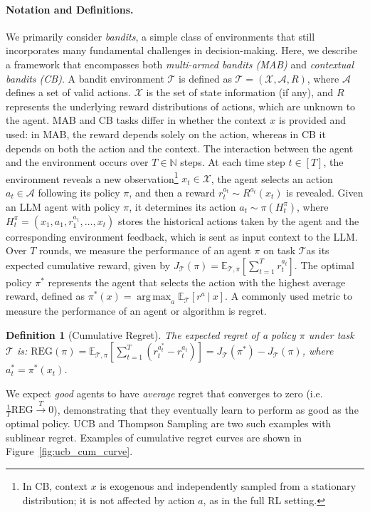 \documentclass[11pt, logo]{googledeepmind}
\newtheorem{defn}{Definition}[]
\def\gA{{\mathcal{A}}}
\def\gT{{\mathcal{T}}}
\def\gX{{\mathcal{X}}}
\newcommand{\E}{\mathbb{E}}
\DeclareMathOperator*{\argmax}{arg\,max}
\theoremstyle{plain}
\theoremstyle{definition}
\begin{document}
\paragraph{Notation and Definitions.}
\label{sec:notations}
We primarily consider \textit{bandits}, a simple class of environments that still incorporates many fundamental challenges in decision-making. Here, we describe a framework that encompasses both \textit{multi-armed bandits (MAB)} and \textit{contextual bandits (CB)}. A bandit environment $\gT$ is defined as $\gT=(\gX, \gA, R)$, where $\gA$ defines a set of valid actions. $\gX$ is the set of state information (if any), and $R$ represents the underlying reward distributions of actions, which are unknown to the agent.
MAB and CB tasks differ in whether the context $x$ is provided and used: in MAB, the reward depends solely on the action, whereas in CB it depends on both the action and the context.
The interaction between the agent and the environment occurs over $T \in \mathbb{N}$ steps. At each time step $t \in [T]$, the environment reveals a new observation\footnote{In CB, context $x$ is exogenous and independently sampled from a stationary distribution; it is not affected by action $a$, as in the full RL setting.} $x_t \in \gX$, the agent selects an action $a_t \in \mathcal{A}$ following its policy $\pi$, and then a reward $r_t^{a_t} \sim R^{a_t}(x_t)$ is revealed.
Given an LLM agent with policy $\pi$, it determines its action $a_t \sim \pi(H^\pi_t)$, where $H^\pi_t = (x_1, a_1, r_1^{a_1}, \ldots, x_t)$ stores the historical actions taken by the agent and the corresponding environment feedback, which is sent as input context to the LLM.
Over $T$ rounds, we measure the performance of an agent $\pi$ on task $\mathcal{T} $as its expected cumulative reward, given by $J_{\mathcal{T}}(\pi) = \E_{\mathcal{T}, \pi} \left[\sum_{t =1}^T r_t^{a_t}\right]$. The optimal policy $\pi^*$ represents the agent that selects the action with the highest average reward, defined as $\pi^*(x) = \argmax_a \E_{\mathcal T}\left[r^a \ | \ x \right]$.
A commonly used metric to measure the performance of an agent or algorithm is regret.
\begin{defn}[Cumulative Regret]
The expected regret of a policy $\pi$ under task $\mathcal{T}$ is: $\text{REG}(\pi) = \E_{\mathcal{T}, \pi} \left[\sum_{t=1}^T (r_t^{a^*_t} - r_t^{a_t})  \right] = J_{\mathcal{T}}(\pi^*) - J_\mathcal{T}(\pi)$, where $a^*_t = \pi^*(x_t)$.
\end{defn}
We expect \emph{good} agents to have \textit{average} regret that converges to zero (i.e. $\frac{1}{T}\text{REG} \stackrel{T}{\rightarrow} 0$), demonstrating that they eventually learn to perform as good as the optimal policy. UCB and Thompson Sampling are two such examples with sublinear regret. Examples of cumulative regret curves are shown in Figure~\ref{fig:ucb_cum_curve}.
\end{document}
